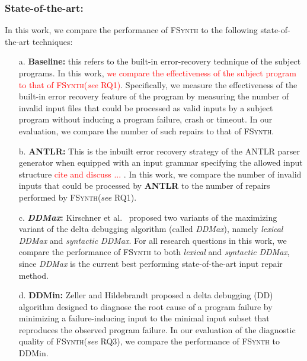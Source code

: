\documentclass[sigconf,review,anonymous]{acmart}
\newcommand{\recheck}[1]{\textcolor{red}{#1}}
\newcommand{\ddmin}{\textit{ddmin}\xspace}
\newcommand{\approach}{\textsc{FSynth}\xspace}
\def\ddmin{DDMin\xspace}
\newcommand{\ddmax}{\textit{DDMax}\xspace}
\begin{document}
\subsubsection*{\bf State-of-the-art:}
In this work, we compare the performance of \approach to the following state-of-the-art techniques: %

\begin{enumerate}[wide, labelwidth=!, labelindent=0pt]
\item[a.] \textbf{Baseline:} this refers to  the built-in error-recovery technique of the subject programs. In this work,  \recheck{we compare the effectiveness of the subject program to that of \approach (\textit{see} RQ1)}. Specifically, we measure the effectiveness of the built-in error recovery feature of the program by measuring the number of invalid input files that could be processed as valid inputs by a subject program without inducing a program failure, crash or timeout. In our evaluation, we compare the number of such repairs to that of \approach.

\item[b.] \textbf{ANTLR:} This is the inbuilt error recovery strategy of the ANTLR parser generator when equipped with an input grammar specifying the allowed input structure \recheck{cite and discuss ... }. In this work, we compare the number of invalid inputs that could be processed by \textbf{ANTLR} to the number of repairs performed by \approach (\textit{see} RQ1).

\item[c.] \textbf{\ddmax:} Kirschner et al.~\cite{kirschner2020debugging} proposed %
two variants of the maximizing variant of the delta debugging algorithm (called \ddmax), %
namely \textit{lexical \ddmax} and \textit{syntactic \ddmax}. For all research questions in this work, we compare the performance of \approach to both \textit{lexical} and \textit{syntactic} \ddmax, since \ddmax is the current best performing state-of-the-art input repair method.


\item[d.] \textbf{\ddmin:} Zeller and Hildebrandt proposed
a delta debugging (DD) algorithm designed to diagnose the root cause of a program failure %
by %
minimizing a failure-inducing input to the minimal input subset that reproduces
the observed program failure. In our evaluation of the diagnostic quality of \approach (\textit{see} RQ3), we compare the performance of \approach to \ddmin.

\end{enumerate}
\end{document}
